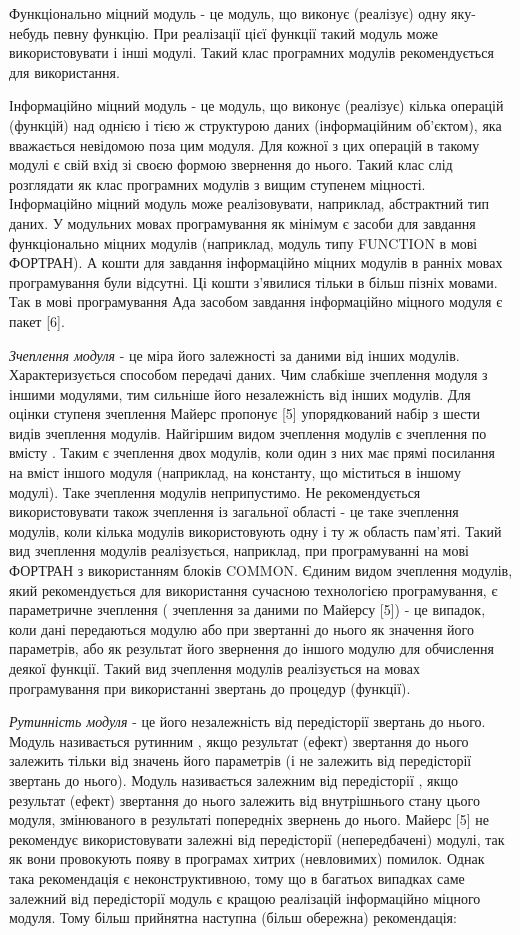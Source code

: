 \documentclass[a4paper,14pt, titlepage]{article}
\begin{document}
Функціонально міцний модуль - це модуль, що виконує (реалізує) одну
яку-небудь певну функцію. При реалізації цієї функції такий модуль може
використовувати і інші модулі. Такий клас програмних модулів
рекомендується для використання.

Інформаційно міцний модуль - це модуль,
що виконує (реалізує) кілька операцій (функцій) над однією і тією ж
структурою даних (інформаційним об'єктом), яка вважається невідомою поза
цим модуля. Для кожної з цих операцій в такому модулі є свій вхід зі
своєю формою звернення до нього. Такий клас слід розглядати як клас
програмних модулів з вищим ступенем міцності. Інформаційно міцний модуль
може реалізовувати, наприклад, абстрактний тип даних. У модульних мовах
програмування як мінімум є засоби для завдання функціонально міцних
модулів (наприклад, модуль типу FUNCTION в мові ФОРТРАН). А кошти для
завдання інформаційно міцних модулів в ранніх мовах програмування були
відсутні. Ці кошти з'явилися тільки в більш пізніх мовами. Так в мові
програмування Ада засобом завдання інформаційно міцного модуля є пакет
[6].

\emph{Зчеплення модуля} - це міра його залежності за даними від інших модулів.
Характеризується способом передачі даних. Чим слабкіше зчеплення модуля
з іншими модулями, тим сильніше його незалежність від інших модулів. Для
оцінки ступеня зчеплення Майерс пропонує [5] упорядкований набір з
шести видів зчеплення модулів. Найгіршим видом зчеплення модулів є
зчеплення по вмісту . Таким є зчеплення двох модулів, коли один з них
має прямі посилання на вміст іншого модуля (наприклад, на константу, що
міститься в іншому модулі). Таке зчеплення модулів неприпустимо. Не
рекомендується використовувати також зчеплення із загальної області - це
таке зчеплення модулів, коли кілька модулів використовують одну і ту ж
область пам'яті. Такий вид зчеплення модулів реалізується, наприклад,
при програмуванні на мові ФОРТРАН з використанням блоків COMMON. Єдиним
видом зчеплення модулів, який рекомендується для використання сучасною
технологією програмування, є параметричне зчеплення ( зчеплення за
даними по Майерсу [5]) - це випадок, коли дані передаються модулю
або при звертанні до нього як значення його параметрів, або як результат
його звернення до іншого модулю для обчислення деякої функції. Такий вид
зчеплення модулів реалізується на мовах програмування при використанні
звертань до процедур (функції).

\emph{Рутинність модуля} - це його незалежність від передісторії звертань до
нього. Модуль називається рутинним , якщо результат (ефект) звертання до
нього залежить тільки від значень його параметрів (і не залежить від
передісторії звертань до нього). Модуль називається залежним від
передісторії , якщо результат (ефект) звертання до нього залежить від
внутрішнього стану цього модуля, змінюваного в результаті попередніх
звернень до нього. Майерс [5] не рекомендує використовувати залежні
від передісторії (непередбачені) модулі, так як вони провокують появу в
програмах хитрих (невловимих) помилок. Однак така рекомендація є
неконструктивною, тому що в багатьох випадках саме залежний від
передісторії модуль є кращою реалізацій інформаційно міцного модуля.
Тому більш прийнятна наступна (більш обережна) рекомендація:
\end{document}
